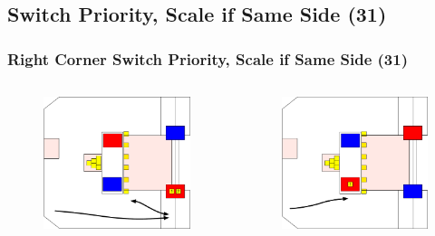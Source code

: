 \documentclass{beamer}
\begin{document}
\subsection{Switch Priority, Scale if Same Side (31)}

\begin{frame}
 \frametitle{Right Corner Switch Priority, Scale if Same Side \alert{(31)}}
 \begin{columns}
  \begin{figure}
   \includegraphics[scale=0.15]{assets/paths/31_LR}
  \end{figure}
  \begin{figure}
   \includegraphics[scale=0.15]{assets/paths/31_RL}

\end{figure}
\end{columns}
\end{frame}
\end{document}
